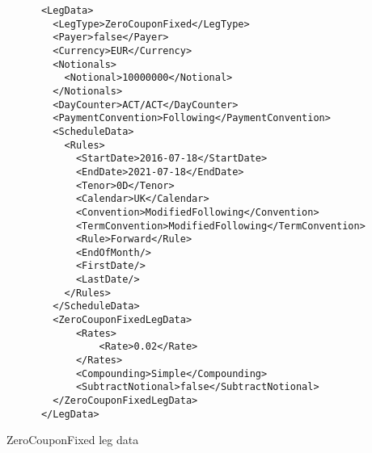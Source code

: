 \begin{listing}[H]
\begin{verbatim}
      <LegData>
        <LegType>ZeroCouponFixed</LegType>
        <Payer>false</Payer>
        <Currency>EUR</Currency>
        <Notionals>
          <Notional>10000000</Notional>
        </Notionals>
        <DayCounter>ACT/ACT</DayCounter>
        <PaymentConvention>Following</PaymentConvention>
        <ScheduleData>
          <Rules>
            <StartDate>2016-07-18</StartDate>
            <EndDate>2021-07-18</EndDate>
            <Tenor>0D</Tenor>
            <Calendar>UK</Calendar>
            <Convention>ModifiedFollowing</Convention>
            <TermConvention>ModifiedFollowing</TermConvention>
            <Rule>Forward</Rule>
            <EndOfMonth/>
            <FirstDate/>
            <LastDate/>
          </Rules>
        </ScheduleData>
        <ZeroCouponFixedLegData>
            <Rates>
                <Rate>0.02</Rate>
            </Rates>
            <Compounding>Simple</Compounding>
            <SubtractNotional>false</SubtractNotional>
        </ZeroCouponFixedLegData>
      </LegData>
\end{verbatim}
\caption{ZeroCouponFixed leg data}
\label{lst:zerolegdata}
\end{listing}

